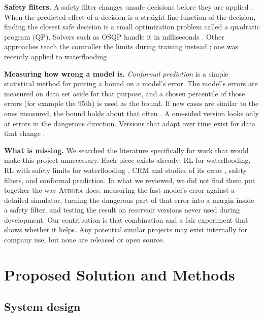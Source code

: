\documentclass[11pt,letterpaper]{article}
\newcommand{\aur}{\textsc{Aurora}}
\begin{document}
\textbf{Safety filters.} A safety filter changes unsafe decisions before they are applied
\cite{wabersich2021filter,dalal2018safety}. When the predicted effect of a decision is a
straight-line function of the decision, finding the closest safe decision is a small
optimization problem called a quadratic program (QP). Solvers such as OSQP handle it in
milliseconds \cite{stellato2020osqp}. Other approaches teach the controller the limits
during training instead \cite{achiam2017cpo}; one was recently applied to waterflooding
\cite{chen2025wcsac}.

\textbf{Measuring how wrong a model is.} \emph{Conformal prediction} is a simple
statistical method for putting a bound on a model's error. The model's errors are measured
on data set aside for that purpose, and a chosen percentile of those errors (for example
the 95th) is used as the bound. If new cases are similar to the ones measured, the bound
holds about that often \cite{lei2018conformal,angelopoulos2021gentle}. A one-sided version
looks only at errors in the dangerous direction. Versions that adapt over time exist for
data that change \cite{gibbs2021aci}.

\textbf{What is missing.} We searched the literature specifically for work that would make
this project unnecessary. Each piece exists already: RL for waterflooding, RL with safety
limits for waterflooding \cite{chen2025wcsac}, CRM and studies of its error
\cite{mamghaderi2021crm}, safety filters, and conformal prediction. In what we reviewed, we
did not find them put together the way \aur{} does: measuring the fast model's error
against a detailed simulator, turning the dangerous part of that error into a margin inside
a safety filter, and testing the result on reservoir versions never used during
development. Our contribution is that combination and a fair experiment that shows whether
it helps. Any potential similar projects may exist internally for company use, but none are 
released or open source.

\section{Proposed Solution and Methods}\label{sec:solution}

\subsection{System design}
\end{document}
